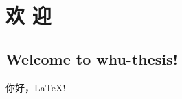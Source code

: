\documentclass{whu-thesis}
\begin{document}
\chapter{ 欢 迎 }
\section{Welcome to whu-thesis!} 你好，\LaTeX{}!












\end{document}
